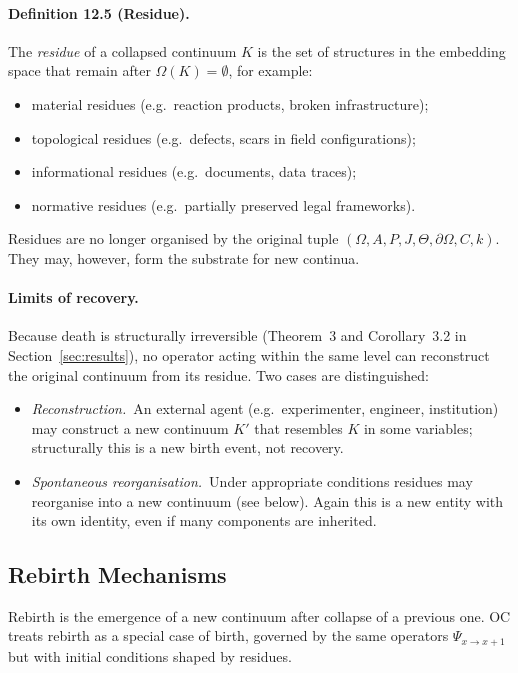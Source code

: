 \paragraph{Definition 12.5 (Residue).}
The \emph{residue} of a collapsed continuum \(K\) is the set of structures in
the embedding space that remain after \(\Omega(K)=\emptyset\), for example:
\begin{itemize}
  \item material residues (e.g.\ reaction products, broken infrastructure);
  \item topological residues (e.g.\ defects, scars in field configurations);
  \item informational residues (e.g.\ documents, data traces);
  \item normative residues (e.g.\ partially preserved legal frameworks).
\end{itemize}

Residues are no longer organised by the original tuple
\((\Omega,A,P,J,\Theta,\partial\Omega,C,k)\). They may, however, form the
substrate for new continua.

\paragraph{Limits of recovery.}
Because death is structurally irreversible
(Theorem~3 and Corollary~3.2 in Section~\ref{sec:results}), no operator acting
within the same level can reconstruct the original continuum from its
residue. Two cases are distinguished:
\begin{itemize}
  \item \emph{Reconstruction.}\ 
        An external agent (e.g.\ experimenter, engineer, institution) may
        construct a new continuum \(K'\) that resembles \(K\) in some
        variables; structurally this is a new birth event, not recovery.
  \item \emph{Spontaneous reorganisation.}\ 
        Under appropriate conditions residues may reorganise into a new
        continuum (see below). Again this is a new entity with its own
        identity, even if many components are inherited.
\end{itemize}

\subsection{Rebirth Mechanisms}

Rebirth is the emergence of a new continuum after collapse of a previous one.
OC treats rebirth as a special case of birth, governed by the same operators
\(\Psi_{x\to x+1}\) but with initial conditions shaped by residues.


